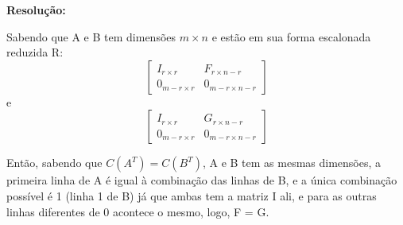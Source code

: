 \documentclass[leqno]{article}
\numberwithin{equation}{section}
\theoremstyle{definition}
\newenvironment{sol}
	{
		\vspace{4mm}
		\noindent\textbf{Resolução:}
		\strut\newline
		\smallskip
		\hspace{-3.5mm}
	}
	{}
\begin{document}
\begin{enumerate}
		\begin{sol} 
			Sabendo que A e B tem dimensões $m \times n$ e estão em sua forma escalonada reduzida R:
			$$\begin{bmatrix}
			  I_{r \times r} & F_{r \times n-r} \\
			  0_{m-r \times r} & 0_{m-r \times n-r}
			\end{bmatrix}$$ e $$\begin{bmatrix}
			  I_{r \times r} & G_{r \times n-r} \\
			  0_{m-r \times r} & 0_{m-r \times n-r}
			\end{bmatrix}$$
	    	
	  		Então, sabendo que $C(A^T) = C(B^T)$, A e B tem as mesmas dimensões, a primeira linha de A é igual à combinação das linhas de B, e a única combinação possível é 1 (linha 1 de B) já que ambas tem a matriz I ali, e para as outras linhas diferentes de 0 acontece o mesmo, logo, F = G.
	  
	  	

		\end{sol} 
	\end{enumerate}
	
	
	
	
	
	
	
	
	
	
	
	
	
	
	
\end{document}

